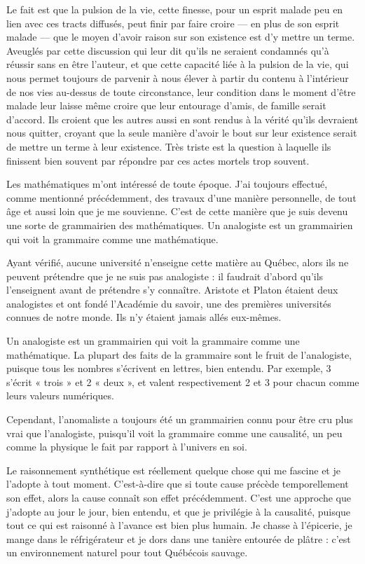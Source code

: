 \documentclass[12pt,oneside]{article}
\begin{document}
Le fait est que la pulsion de la vie, cette finesse, pour un esprit malade peu en lien avec ces tracts diffusés, peut finir par faire croire --- en plus de son esprit malade --- que le moyen d'avoir raison sur son existence est d'y mettre un terme. Aveuglés par cette discussion qui leur dit qu'ils ne seraient condamnés qu'à réussir sans en être l'auteur, et que cette capacité liée à la pulsion de la vie, qui nous permet toujours de parvenir à nous élever à partir du contenu à l'intérieur de nos vies au-dessus de toute circonstance, leur condition dans le moment d'être malade leur laisse même croire que leur entourage d'amis, de famille serait d'accord. Ils croient que les autres aussi en sont rendus à la vérité qu'ils devraient nous quitter, croyant que la seule manière d'avoir le bout sur leur existence serait de mettre un terme à leur existence. Très triste est la question à laquelle ils finissent bien souvent par répondre par ces actes mortels trop souvent.

Les mathématiques m'ont intéressé de toute époque. J'ai toujours effectué, comme mentionné précédemment, des travaux d'une manière personnelle, de tout âge et aussi loin que je me souvienne. C'est de cette manière que je suis devenu une sorte de grammairien des mathématiques. Un analogiste est un grammairien qui voit la grammaire comme une mathématique.

Ayant vérifié, aucune université n'enseigne cette matière au Québec, alors ils ne peuvent prétendre que je ne suis pas analogiste : il faudrait d'abord qu'ils l'enseignent avant de prétendre s'y connaître. Aristote et Platon étaient deux analogistes et ont fondé l'Académie du savoir, une des premières universités connues de notre monde. Ils n'y étaient jamais allés eux-mêmes.

Un analogiste est un grammairien qui voit la grammaire comme une mathématique. La plupart des faits de la grammaire sont le fruit de l'analogiste, puisque tous les nombres s'écrivent en lettres, bien entendu. Par exemple, 3 s'écrit « trois » et 2 « deux », et valent respectivement 2 et 3 pour chacun comme leurs valeurs numériques.

Cependant, l'anomaliste a toujours été un grammairien connu pour être cru plus vrai que l'analogiste, puisqu'il voit la grammaire comme une causalité, un peu comme la physique le fait par rapport à l'univers en soi.

Le raisonnement synthétique est réellement quelque chose qui me fascine et je l'adopte à tout moment. C'est-à-dire que si toute cause précède temporellement son effet, alors la cause connaît son effet précédemment. C'est une approche que j'adopte au jour le jour, bien entendu, et que je privilégie à la causalité, puisque tout ce qui est raisonné à l'avance est bien plus humain. Je chasse à l'épicerie, je mange dans le réfrigérateur et je dors dans une tanière entourée de plâtre : c'est un environnement naturel pour tout Québécois sauvage.
\end{document}
